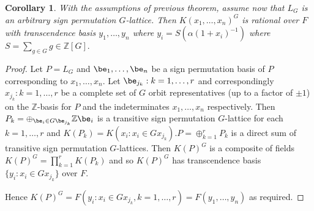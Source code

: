 \documentclass[12pt]{article}
\theoremstyle{plain}
\newtheorem{corollary}[theorem]{Corollary}
\newcommand{\Z}{\ensuremath{\mathbb{Z}}}
\begin{document}
\begin{corollary}
With the assumptions of previous theorem, assume now that $L_G$ is an arbitrary sign permutation $G$-lattice. Then $ K(x_1,\ldots , x_n)^G$ is rational over $F$ with transcendence basis $y_1, \ldots , y_n$ where $y_i = S(\alpha (1+x_i)^{-1})$ where $S = \sum_{g\in G}g \in \Z[G].$ 
\end{corollary}
\begin{proof}
Let $P = L_G$ and $\be_1, \ldots , \be_n$ be a sign permutation basis of $P$ corresponding to $x_1, \ldots, x_n$. Let $\be_{j_k}: k = 1, \ldots, r$ and correspondingly $x_{j_k}: k = 1, \ldots, r$ be a complete set of $G$ orbit representatives (up to a factor of $\pm 1$) on the $\Z$-basis for $P$ and the indeterminates $x_1, \ldots, x_n$ respectively. Then $P_k = \oplus_{ \be_i \in G \be_{j_{k}} } \Z \be_i$ is a transitive sign permutation $G$-lattice for each $k = 1, \ldots , r$ and $K(P_k) = K(x_i : x_i \in Gx_{j_k})$.$P = \oplus^r_{k =1} P_k$ is a direct sum of transitive sign permutation $G$-lattices. Then $K(P)^G$ is a composite of fields $K(P)^G = \prod^r_{k =1}K(P_k)$ and so $K(P)^G$ has transcendence basis $\lbrace y_i: x_i \in Gx_{j_k}\rbrace$ over $F$.

Hence $K(P)^G = F(y_i : x_i \in Gx_{j_k}, k = 1, \ldots,r) = F(y_1, \ldots,y_n)$ as required.

\end{proof}
\end{document}
